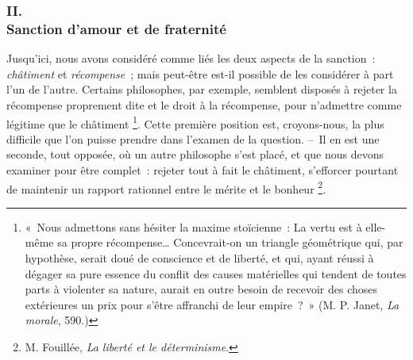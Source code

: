 \documentclass[french,twoside]{book} %
\begin{document}
\subsubsection[{II. Sanction d’amour et de fraternité}]{II. \\
Sanction d’amour et de fraternité}
\noindent Jusqu’ici, nous avons considéré comme liés les deux aspects de la sanction : \emph{châtiment} et \emph{récompense} ; mais peut-être est-il possible de les considérer à part l’un de l’autre. Certains philosophes, par exemple, semblent disposés à rejeter la récompense proprement dite et le droit à la récompense, pour n’admettre comme légitime que le châtiment \footnote{« Nous admettons sans hésiter la maxime stoïcienne : La vertu est à elle-même sa propre récompense… Concevrait-on un triangle géométrique qui, par hypothèse, serait doué de conscience et de liberté, et qui, ayant réussi à dégager sa pure essence du conflit des causes matérielles qui tendent de toutes parts à violenter sa nature, aurait en outre besoin de recevoir des choses extérieures un prix pour s’être affranchi de leur empire ? » (M. P. Janet, \emph{La morale}, 590.)}. Cette première position est, croyons-nous, la plus difficile que l’on puisse prendre dans l’examen de la question. – Il en est une seconde, tout opposée, où un autre philosophe s’est placé, et que nous devons examiner pour être complet : rejeter tout à fait le châtiment, s’efforcer pourtant de maintenir un rapport rationnel entre le mérite et le bonheur \footnote{M. Fouillée, \emph{La liberté et le déterminisme}.}.\par
\end{document}
